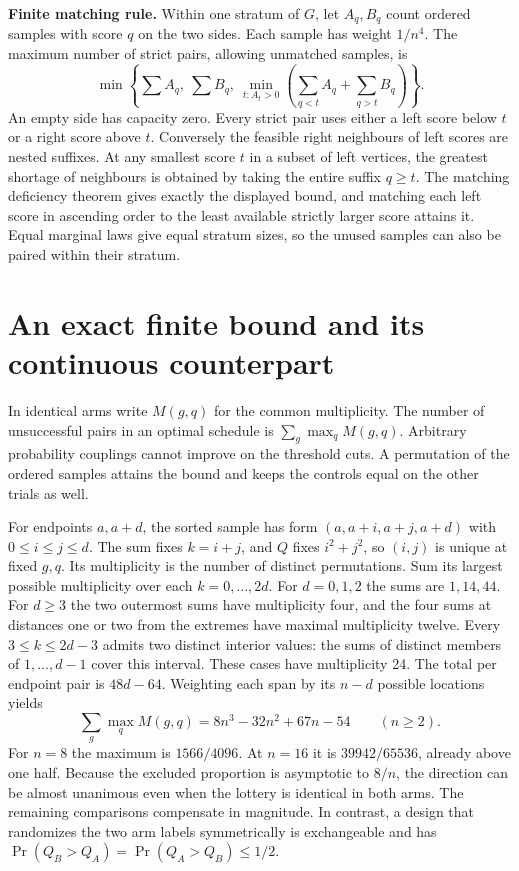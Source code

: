 \documentclass[10pt]{article}
\begin{document}
\textbf{Finite matching rule.} Within one stratum of $G$, let $A_q,B_q$ count ordered samples with score $q$ on the two sides. Each sample has weight $1/n^4$. The maximum number of strict pairs, allowing unmatched samples, is
\[
 \min\left\{\sum A_q,\ \sum B_q,\ \min_{t:A_t>0}
       \left(\sum_{q<t} A_q+\sum_{q>t} B_q\right)\right\}.
\]
An empty side has capacity zero. Every strict pair uses either a left score below $t$ or a right score above $t$. Conversely the feasible right neighbours of left scores are nested suffixes. At any smallest score $t$ in a subset of left vertices, the greatest shortage of neighbours is obtained by taking the entire suffix $q\ge t$. The matching deficiency theorem gives exactly the displayed bound, and matching each left score in ascending order to the least available strictly larger score attains it. Equal marginal laws give equal stratum sizes, so the unused samples can also be paired within their stratum.
\newpage

\section*{An exact finite bound and its continuous counterpart}
In identical arms write $M(g,q)$ for the common multiplicity. The number of unsuccessful pairs in an optimal schedule is $\sum_g\max_q M(g,q)$. Arbitrary probability couplings cannot improve on the threshold cuts. A permutation of the ordered samples attains the bound and keeps the controls equal on the other trials as well.

For endpoints $a,a+d$, the sorted sample has form $(a,a+i,a+j,a+d)$ with $0\le i\le j\le d$. The sum fixes $k=i+j$, and $Q$ fixes $i^2+j^2$, so $(i,j)$ is unique at fixed $g,q$. Its multiplicity is the number of distinct permutations. Sum its largest possible multiplicity over each $k=0,\ldots,2d$. For $d=0,1,2$ the sums are $1,14,44$. For $d\ge3$ the two outermost sums have multiplicity four, and the four sums at distances one or two from the extremes have maximal multiplicity twelve. Every $3\le k\le 2d-3$ admits two distinct interior values: the sums of distinct members of $1,\ldots,d-1$ cover this interval. These cases have multiplicity 24. The total per endpoint pair is $48d-64$. Weighting each span by its $n-d$ possible locations yields
\[
 \sum_g\max_q M(g,q)=8n^3-32n^2+67n-54\qquad(n\ge2).
\]
For $n=8$ the maximum is $1566/4096$. At $n=16$ it is $39942/65536$, already above one half. Because the excluded proportion is asymptotic to $8/n$, the direction can be almost unanimous even when the lottery is identical in both arms. The remaining comparisons compensate in magnitude. In contrast, a design that randomizes the two arm labels symmetrically is exchangeable and has $\Pr(Q_B>Q_A)=\Pr(Q_A>Q_B)\le1/2$.
\end{document}
